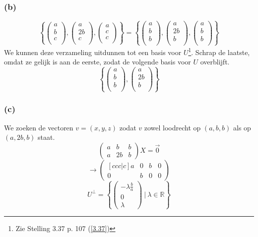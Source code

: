 \documentclass[lineaire_algebra_oplossingen.tex]{subfiles}
\begin{document}
\subsubsection*{(b)}
\[
\left\{
\begin{pmatrix}
a\\b\\c\\
\end{pmatrix}
,
\begin{pmatrix}
a\\2b\\c\\
\end{pmatrix}
,
\begin{pmatrix}
a\\c\\c\\
\end{pmatrix}
\right\}
=
\left\{
\begin{pmatrix}
a\\b\\b\\
\end{pmatrix}
,
\begin{pmatrix}
a\\2b\\b\\
\end{pmatrix}
,
\begin{pmatrix}
a\\b\\b\\
\end{pmatrix}
\right\}
\]
We kunnen deze verzameling uitdunnen tot een basis voor $U$\footnote{Zie Stelling 3.37 p. 107 (\ref{3.37})}. Schrap de laatste, omdat ze gelijk is aan de eerste, zodat de volgende basis voor $U$ overblijft.
\[
\left\{
\begin{pmatrix}
a\\b\\b\\
\end{pmatrix}
,
\begin{pmatrix}
a\\2b\\b\\
\end{pmatrix}
\right\}
\]

\subsubsection*{(c)}
We zoeken de vectoren $v= (x,y,z)$ zodat $v$ zowel loodrecht op $(a,b,b)$ als op $(a,2b,b)$ staat.
\[
\begin{pmatrix}
a & b & b\\
a & 2b & b
\end{pmatrix}
X=\vec{0}
\]
\[
\rightarrow
\begin{pmatrix}[ccc|c]
a & 0 & b & 0\\
0 & b & 0 & 0
\end{pmatrix}
\]
\[
U^\bot = 
\left\{
\begin{pmatrix}
-\lambda\frac{b}{a} \\ 0 \\ \lambda
\end{pmatrix}
\ |\ \lambda\in\mathbb{R}
\right\}
\]
\end{document}
